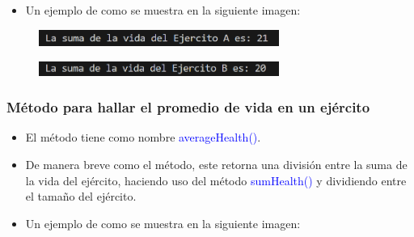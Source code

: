 \documentclass{article}
\begin{document}
        

        \begin{itemize}
            \begin{itemize}
                \item Un ejemplo de como se muestra en la siguiente imagen:
            \end{itemize}
        \end{itemize}

        \begin{figure}[H]
            \centering
            \includegraphics[width=0.7\textwidth,keepaspectratio]{img/sumHealth.png}
            \caption{}
        \end{figure}

        \begin{figure}[H]
            \centering
            \includegraphics[width=0.7\textwidth,keepaspectratio]{img/sumHealth2.png}
            \caption{}
        \end{figure}
        
        
        \subsubsection{Método para hallar el promedio de vida en un ejército}

        \begin{itemize}
            \item El método tiene como nombre \textcolor{blue}{averageHealth()}.
            \item De manera breve como el método, este retorna una división entre la suma de la vida del ejército, haciendo uso del método \textcolor{blue}{sumHealth()} y dividiendo entre el tamaño del ejército.
        \end{itemize}

        

        \begin{itemize}
            \begin{itemize}
                \item Un ejemplo de como se muestra en la siguiente imagen:
            \end{itemize}
        \end{itemize}
\end{document}
